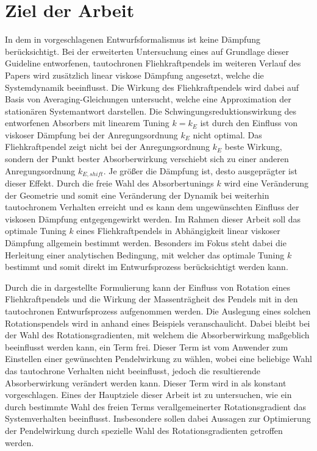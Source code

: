 \section{Ziel der Arbeit}
%
In dem in  \cite{Mayet:Tautochronic} vorgeschlagenen Entwurfsformalismus ist keine
Dämpfung berücksichtigt. 
Bei der erweiterten Untersuchung eines auf Grundlage dieser Guideline entworfenen, tautochronen 
Fliehkraftpendels im weiteren Verlauf des Papers wird zusätzlich linear viskose Dämpfung
angesetzt, welche die Systemdynamik beeinflusst.
Die Wirkung des Fliehkraftpendels wird dabei auf Basis von Averaging-Gleichungen
untersucht, welche eine Approximation der stationären Systemantwort  darstellen.
Die Schwingungsreduktionswirkung des entworfenen Absorbers
mit linearem Tuning $k=k_E$ ist durch den Einfluss von viskoser Dämpfung 
bei der Anregungsordnung $k_E$ nicht optimal.
Das Fliehkraftpendel zeigt nicht bei der Anregungsordnung $k_E$ beste Wirkung,
sondern der Punkt bester Absorberwirkung verschiebt sich zu einer 
anderen Anregungsordnung $k_{E,shift}$. 
Je größer die  Dämpfung ist, desto ausgeprägter ist dieser Effekt.
Durch die freie Wahl des Absorbertunings $k$ wird eine Veränderung der Geometrie und somit
eine Veränderung der Dynamik bei weiterhin tautochronem Verhalten erreicht und es kann
dem ungewünschten Einfluss der viskosen Dämpfung entgegengewirkt werden. 
Im Rahmen dieser Arbeit soll das optimale Tuning $k$ eines Fliehkraftpendels
in Abhängigkeit linear viskoser Dämpfung allgemein bestimmt werden.
Besonders im Fokus steht dabei die Herleitung einer  analytischen Bedingung,
mit welcher das optimale Tuning $k$ bestimmt und somit
direkt im Entwurfsprozess berücksichtigt werden kann.

Durch die in \cite{Mayet:Tautochronic} dargestellte Formulierung kann der
Einfluss von  Rotation eines
Fliehkraftpendels und die Wirkung
der Massenträgheit des Pendels mit in den tautochronen Entwurfsprozess aufgenommen werden.
Die Auslegung eines solchen Rotationspendels wird in \cite{Mayet:Tautochronic} anhand
eines Beispiels veranschaulicht.
Dabei bleibt bei der Wahl des Rotationsgradienten, mit welchem die Absorberwirkung maßgeblich
beeinflusst werden kann, ein Term frei. Dieser Term ist vom Anwender zum Einstellen 
einer gewünschten Pendelwirkung zu wählen, wobei eine beliebige Wahl das tautochrone Verhalten
nicht beeinflusst, jedoch die resultierende Absorberwirkung verändert werden kann.
Dieser Term wird in \cite{Mayet:Tautochronic}  als konstant vorgeschlagen.
Eines der Hauptziele dieser Arbeit ist zu untersuchen, wie ein durch bestimmte Wahl des freien
Terms verallgemeinerter Rotationsgradient das Systemverhalten beeinflusst.
Insbesondere sollen dabei Aussagen zur Optimierung der Pendelwirkung durch
spezielle Wahl des Rotationsgradienten getroffen werden. 

